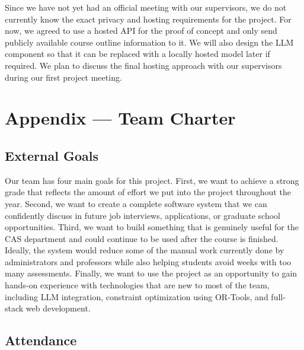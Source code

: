\documentclass{article}
\begin{document}
\bigskip
Since we have not yet had an official meeting with our supervisors, we do not
currently know the exact privacy and hosting requirements for the project. For
now, we agreed to use a hosted API for the proof of concept and only send
publicly available course outline information to it. We will also design the LLM
component so that it can be replaced with a locally hosted model later if
required. We plan to discuss the final hosting approach with our supervisors
during our first project meeting.

\newpage{}

\section*{Appendix --- Team Charter}


\subsection*{External Goals}


Our team has four main goals for this project. First, we want to achieve a
strong grade that reflects the amount of effort we put into the project
throughout the year. Second, we want to create a complete software system that
we can confidently discuss in future job interviews, applications, or graduate
school opportunities. Third, we want to build something that is genuinely useful
for the CAS department and could continue to be used after the course is
finished. Ideally, the system would reduce some of the manual work currently
done by administrators and professors while also helping students avoid weeks
with too many assessments. Finally, we want to use the project as an opportunity
to gain hands-on experience with technologies that are new to most of the team,
including LLM integration, constraint optimization using OR-Tools, and
full-stack web development.

\subsection*{Attendance}
\end{document}
